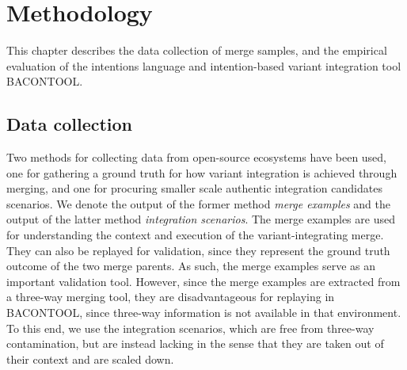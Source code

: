 \chapter{Methodology}
This chapter describes the data collection of merge samples, and the empirical evaluation of the intentions language and intention-based variant integration tool BACONTOOL.

\section{Data collection}
Two methods for collecting data from open-source ecosystems have been used, one for gathering a ground truth for how variant integration is achieved through merging, and one for procuring smaller scale authentic integration candidates scenarios. We denote the output of the former method \textit{merge examples} and the output of the latter method \textit{integration scenarios}. The merge examples are used for understanding the context and execution of the variant-integrating merge. They can also be replayed for validation, since they represent the ground truth outcome of the two merge parents. As such, the merge examples serve as an important validation tool. However, since the merge examples are extracted from a three-way merging tool, they are disadvantageous for replaying in BACONTOOL, since three-way information is not available in that environment. To this end, we use the integration scenarios, which are free from three-way contamination, but are instead lacking in the sense that they are taken out of their context and are scaled down.

